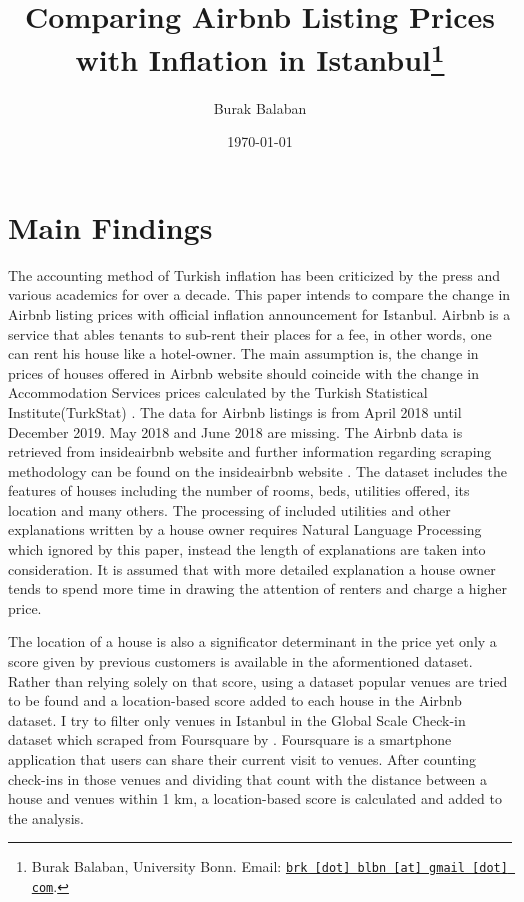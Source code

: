 \documentclass[11pt, a4paper, leqno]{article}
\begin{document}
\title{Comparing Airbnb Listing Prices with Inflation in Istanbul\thanks{Burak Balaban, University Bonn. Email: \href{mailto:brk.blbn@gmail.com}{\nolinkurl{brk [dot] blbn [at] gmail [dot] com}}.}}

\author{Burak Balaban}

\date{\today}

\maketitle


\section{Main Findings}

The accounting method of Turkish inflation has been criticized
by the press and various academics for over a decade.
This paper intends to compare the change in Airbnb listing prices with
official inflation announcement for Istanbul.
Airbnb is a service that ables tenants to sub-rent their places for a fee,
in other words, one can rent his house like a hotel-owner.
The main assumption is, the change in prices of houses offered in Airbnb
website should coincide with the change in Accommodation Services prices
calculated by the Turkish Statistical Institute(TurkStat) \cite{TurkStat}.
The data for Airbnb listings is from April 2018 until December 2019.
May 2018 and June 2018 are missing. The Airbnb data is retrieved from
insideairbnb website and further information regarding
scraping methodology can be found on the insideairbnb website \cite{insideairbnb}.
The dataset includes the features of houses including the number of rooms, beds,
utilities offered, its location and many others.
The processing of included utilities and other explanations written by a house owner
requires Natural Language Processing which ignored by this paper, instead
the length of explanations are taken into consideration.
It is assumed that with more detailed explanation a house owner
tends to spend more time in drawing the attention of renters and
charge a higher price.

The location of a house is also a significator determinant in the price yet
only a score given by previous customers is available in the aformentioned
dataset. Rather than relying solely on that score, using a dataset
popular venues are tried to be found and a location-based score
added to each house in the Airbnb dataset.
I try to filter only venues in Istanbul in the Global Scale Check-in dataset
which scraped from Foursquare by \cite{yang2016participatory}.
Foursquare is a smartphone application that users can share their
current visit to venues.
After counting check-ins in those venues and dividing that count with
the distance between a house and venues within 1 km,
a location-based score is calculated and added to the analysis.
\end{document}
